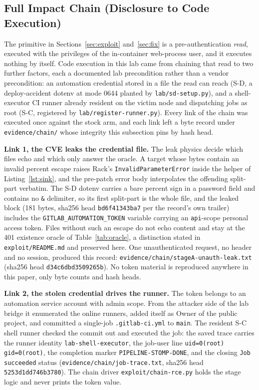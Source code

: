 \documentclass[journal]{IEEEtran}
\begin{document}
\subsection{Full Impact Chain (Disclosure to Code Execution)}
\label{sec:chain}

The primitive in Sections~\ref{sec:exploit} and~\ref{sec:fix} is a
pre-authentication \emph{read}, executed with the privileges of the
in-container web-process user, and it executes nothing by itself. Code
execution in this lab came from chaining that read to two further factors,
each a documented lab precondition rather than a vendor precondition: an
automation credential stored in a file the read can reach (S-D, a
deploy-accident dotenv at mode 0644 planted by
\texttt{lab/sd-setup.py}), and a shell-executor CI runner already resident on
the victim node and dispatching jobs as root (S-C, registered by
\texttt{lab/register-runner.py}). Every link of the chain was executed once
against the stock arm, and each link left a byte record under
\texttt{evidence/chain/} whose integrity this subsection pins by hash head.

\textbf{Link 1, the CVE leaks the credential file.} The leak physics decide
which files echo and which only answer the oracle. A target whose bytes
contain an invalid percent escape raises Rack's \texttt{InvalidParameterError}
inside the helper of Listing~\ref{lst:sink}, and the pre-patch error body
interpolates the offending split-part verbatim. The S-D dotenv carries a bare
percent sign in a password field and contains no \texttt{\&} delimiter, so its
first split-part is the whole file, and the leaked block (181 bytes, sha256
head \texttt{bd6f41343ba7} per the record's own trailer) includes the
\texttt{GITLAB\_AUTOMATION\_TOKEN} variable carrying an \texttt{api}-scope
personal access token. Files without such an escape do not echo content and
stay at the 401 existence oracle of Table~\ref{tab:oracle}, a distinction
stated in \texttt{exploit/README.md} and preserved here. One unauthenticated
request, no header and no session, produced this record:
\texttt{evidence/chain/stageA-unauth-leak.txt} (sha256 head
\texttt{d34c6dbd3509265b}).
No token material is reproduced anywhere in this paper, only byte counts and
hash heads.

\textbf{Link 2, the stolen credential drives the runner.} The token belongs to
an automation service account with admin scope. From the attacker side of the
lab bridge it enumerated the online runners, added itself as Owner of the
public project, and committed a single-job \texttt{.gitlab-ci.yml} to
\texttt{main}. The resident S-C shell runner checked the commit out and
executed the job: the saved trace carries the runner identity
\texttt{lab-shell-executor}, the job-user line \texttt{uid=0(root)
gid=0(root)}, the completion marker \texttt{PIPELINE-STOMP-DONE}, and the
closing \texttt{Job succeeded} status
(\texttt{evidence/chain/job-trace.txt}, sha256 head
\texttt{5253d1dd746b3780}).
The chain driver \texttt{exploit/chain-rce.py} holds the stage logic and never
prints the token value.
\end{document}
